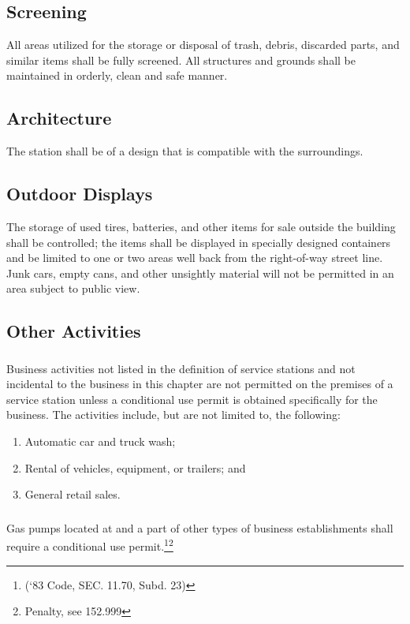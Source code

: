\subsection{Screening}
All areas utilized for the storage or disposal of trash, debris, discarded parts, and similar items shall be fully screened.  All structures and grounds shall be maintained in orderly, clean and safe manner.
\subsection{Architecture}
The station shall be of a design that is compatible with the surroundings.
\subsection{Outdoor Displays}
The storage of used tires, batteries, and other items for sale outside the building shall be controlled; the items shall be displayed in specially designed containers and be limited to one or two areas well back from the right-of-way street line. Junk cars, empty cans, and other unsightly material will not be permitted in an area subject to public view.
\subsection{Other Activities}
\subsubsection{}
Business activities not listed in the definition of service stations and not incidental to the business in this chapter are not permitted on the premises of a service station unless a conditional use permit is obtained specifically for the business. The activities include, but are not limited to, the following:
\begin{enumerate}[{\indent}a)]
    \item Automatic car and truck wash; 
    \item Rental of vehicles, equipment, or trailers; and 
    \item General retail sales.
\end{enumerate}
\subsubsection{}
Gas pumps located at and a part of other types of business establishments shall require a conditional use permit.\footnote{(‘83 Code, SEC. 11.70, Subd. 23)}\footnote{Penalty, see 152.999}
